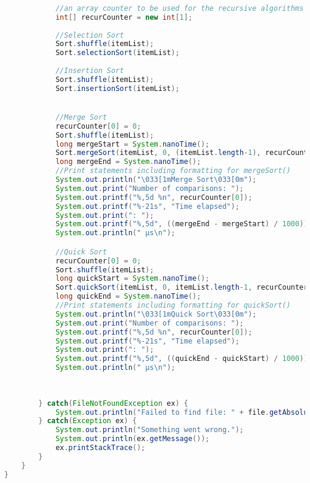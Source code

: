 \documentclass[letterpaper, 10pt,DIV=13]{scrartcl}
\numberwithin{equation}{section} %
\numberwithin{figure}{section} %
\numberwithin{table}{section} %
\begin{document}
\begin{lstlisting}[frame=single, breaklines, language=java]
            
            //an array counter to be used for the recursive algorithms
            int[] recurCounter = new int[1];
            
            //Selection Sort
            Sort.shuffle(itemList);
            Sort.selectionSort(itemList);
            
            //Insertion Sort
            Sort.shuffle(itemList);
            Sort.insertionSort(itemList);


            //Merge Sort
            recurCounter[0] = 0;
            Sort.shuffle(itemList);
            long mergeStart = System.nanoTime();
            Sort.mergeSort(itemList, 0, (itemList.length-1), recurCounter);
            long mergeEnd = System.nanoTime();
            //Print statements including formatting for mergeSort()
            System.out.println("\033[1mMerge Sort\033[0m");
            System.out.print("Number of comparisons: ");
            System.out.printf("%,5d %n", recurCounter[0]);
            System.out.printf("%-21s", "Time elapsed");
            System.out.print(": ");
            System.out.printf("%,5d", ((mergeEnd - mergeStart) / 1000));
            System.out.println(" µs\n");

            //Quick Sort
            recurCounter[0] = 0;
            Sort.shuffle(itemList);
            long quickStart = System.nanoTime();
            Sort.quickSort(itemList, 0, itemList.length-1, recurCounter);
            long quickEnd = System.nanoTime();
            //Print statements including formatting for quickSort()
            System.out.println("\033[1mQuick Sort\033[0m");
            System.out.print("Number of comparisons: ");
            System.out.printf("%,5d %n", recurCounter[0]);
            System.out.printf("%-21s", "Time elapsed");
            System.out.print(": ");
            System.out.printf("%,5d", ((quickEnd - quickStart) / 1000));
            System.out.println(" µs\n");
            
            
            
        } catch(FileNotFoundException ex) {
			System.out.println("Failed to find file: " + file.getAbsolutePath());
        } catch(Exception ex) {
            System.out.println("Something went wrong.");
            System.out.println(ex.getMessage());
            ex.printStackTrace();
        }
    }
}
\end{lstlisting}
\end{document}
